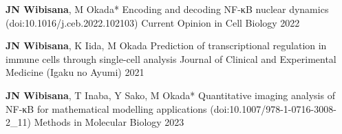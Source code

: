 
\begin{cventries}

  \cventrypub
    {\textbf{JN Wibisana}, M Okada*} %
    {Encoding and decoding NF-κB nuclear dynamics (doi:10.1016/j.ceb.2022.102103)} %
    {Current Opinion in Cell Biology} %
    {2022} %

  \cventrypublast
    {\textbf{JN Wibisana}, K Iida, M Okada} %
    {Prediction of transcriptional regulation in immune cells through single-cell analysis} %
    {Journal of Clinical and Experimental Medicine (Igaku no Ayumi)} %
    {2021} %


\end{cventries}
  


\begin{cventries}

  \cventrypublast
    {\textbf{JN Wibisana}, T Inaba, Y Sako, M Okada*} %
    {Quantitative imaging analysis of NF-κB for mathematical modelling applications (doi:10.1007/978-1-0716-3008-2\_11)} %
    {Methods in Molecular Biology} %
    {2023} %


\end{cventries}